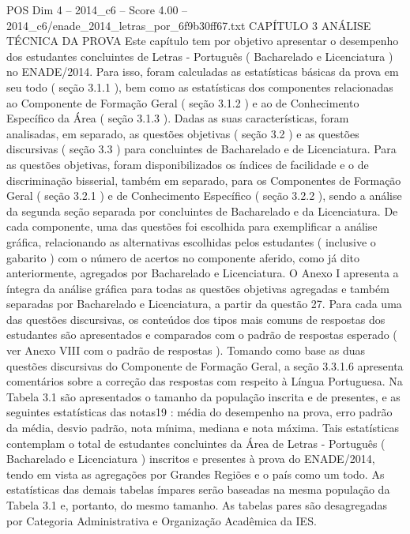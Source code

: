 \begin{textsample}{POS Dim 4 – 2014\_c6 – Score 4.00 – 2014\_c6/enade\_2014\_letras\_por\_6f9b30ff67.txt}  \label{ex:f4_pos_073}
CAPÍTULO 3 ANÁLISE TÉCNICA DA PROVA Este capítulo tem por objetivo apresentar o desempenho dos estudantes concluintes de Letras - Português ( Bacharelado e Licenciatura ) no ENADE/2014.
Para isso, foram calculadas as estatísticas básicas da prova em seu todo ( seção 3.1.1 ), bem como as estatísticas dos componentes relacionadas ao Componente de Formação Geral ( seção 3.1.2 ) e ao de Conhecimento Específico da Área ( seção 3.1.3 ).
Dadas as suas características, foram analisadas, em separado, as questões objetivas ( seção 3.2 ) e as questões discursivas ( seção 3.3 ) para concluintes de Bacharelado e de Licenciatura.
Para as questões objetivas, foram disponibilizados os índices de facilidade e o de discriminação bisserial, também em separado, para os Componentes de Formação Geral ( seção 3.2.1 ) e de Conhecimento Específico ( seção 3.2.2 ), sendo a análise da segunda seção separada por concluintes de Bacharelado e da Licenciatura.
De cada componente, uma das questões foi escolhida para exemplificar a análise gráfica, relacionando as alternativas escolhidas pelos estudantes ( inclusive o gabarito ) com o número de acertos no componente aferido, como já dito anteriormente, agregados por Bacharelado e Licenciatura.
O Anexo I apresenta a íntegra da análise gráfica para todas as questões objetivas agregadas e também separadas por Bacharelado e Licenciatura, a partir da questão 27.
Para cada uma das questões discursivas, os conteúdos dos tipos mais comuns de respostas dos estudantes são apresentados e comparados com o padrão de respostas esperado ( ver Anexo VIII com o padrão de respostas ).
Tomando como base as duas questões discursivas do Componente de Formação Geral, a seção 3.3.1.6 apresenta comentários sobre a correção das respostas com respeito à Língua Portuguesa.
Na Tabela 3.1 são apresentados o tamanho da população inscrita e de presentes, e as seguintes estatísticas das notas19 : média do desempenho na prova, erro padrão da média, desvio padrão, nota mínima, mediana e nota máxima.
Tais estatísticas contemplam o total de estudantes concluintes da Área de Letras - Português ( Bacharelado e Licenciatura ) inscritos e presentes à prova do ENADE/2014, tendo em vista as agregações por Grandes Regiões e o país como um todo.
As estatísticas das demais tabelas ímpares serão baseadas na mesma população da Tabela 3.1 e, portanto, do mesmo tamanho.
As tabelas pares são desagregadas por Categoria Administrativa e Organização Acadêmica da IES.

\end{textsample}
